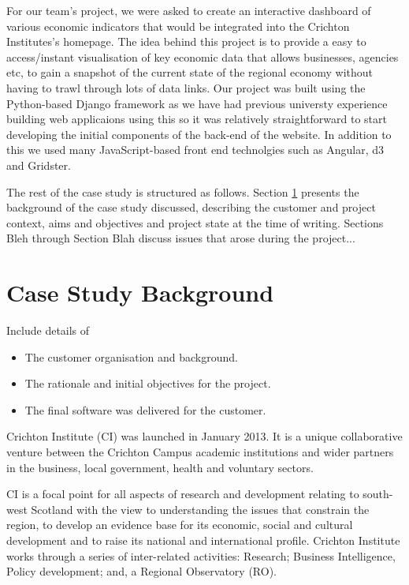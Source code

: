 \documentclass{l3proj}
\begin{document}
For our team's project, we were asked to create an interactive dashboard of various economic indicators that would be
integrated into the Crichton Institutes's homepage. The idea behind this project is to provide a easy to access/instant
visualisation of key economic data that allows businesses, agencies etc, to gain a snapshot of the current state of the
regional economy without having to trawl through lots of data links. Our project was built using the Python-based Django
framework as we have had previous universty experience building web applicaions using this so it was relatively
straightforward to start developing the initial components of the back-end of the website. In addition to this we used
many JavaScript-based front end technolgies such as Angular, d3 and Gridster. 



The rest of the case study is structured as follows.  Section
\ref{sec:background} presents the background of the case study
discussed, describing the customer and project context, aims and
objectives and project state at the time of writing.  Sections
Bleh through Section Blah discuss issues that
arose during the project...

\section{Case Study Background} \label{sec:background}

Include details of 

\begin{itemize}
\item The customer organisation and background.
\item The rationale and initial objectives for the project.
\item The final software was delivered for the customer.
\end{itemize}


Crichton Institute (CI) was launched in January 2013. It is a unique collaborative venture between the Crichton Campus academic
institutions and wider partners in the business, local government, health and voluntary sectors.

CI is a focal point for all aspects of research and development relating to south-west Scotland with the view to understanding the
issues that constrain the region, to develop an evidence base for its economic, social and cultural development and to raise its
national and international profile. Crichton Institute works through a series of inter-related activities: Research;
Business Intelligence, Policy development; and, a Regional Observatory (RO).
\end{document}
